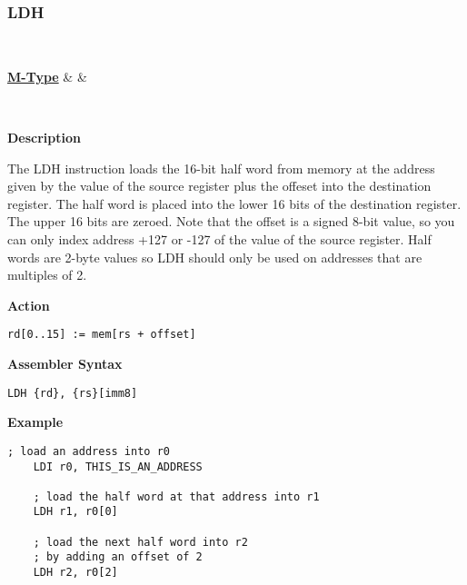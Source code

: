 \subsubsection{LDH }\label{sec:LDH}

\vspace{3ex}

\begin{center}
	\begin{bytefield}[leftcurly=., leftcurlyspace=0pt]{32}
		 \\
		\begin{leftwordgroup}{\hyperref[sec:m-type]{\textbf{M-Type}}}
		 & 
		 &
		\end{leftwordgroup}\\
	\end{bytefield}
\end{center}

\textbf{Description}

The LDH instruction loads the 16-bit half word from memory at the address given by the value of the source register plus the offeset into the destination register.
The half word is placed into the lower 16 bits of the destination register. The upper 16 bits are zeroed.
Note that the offset is a signed 8-bit value, so you can only index address +127 or -127 of the value of the source register.
Half words are 2-byte values so LDH should only be used on addresses that are multiples of 2.

\vspace{3ex}

\textbf{Action}
\begin{lstlisting}[frame=single]
	rd[0..15] := mem[rs + offset]
\end{lstlisting}

\vspace{3ex}

\textbf{Assembler Syntax}
\begin{lstlisting}[frame=single]
	LDH {rd}, {rs}[imm8]
\end{lstlisting}

\vspace{3ex}

\textbf{Example}
\begin{lstlisting}[frame=single]
	; load an address into r0
	LDI r0, THIS_IS_AN_ADDRESS
	
	; load the half word at that address into r1
	LDH r1, r0[0]
	
	; load the next half word into r2
	; by adding an offset of 2
	LDH r2, r0[2]
\end{lstlisting}

